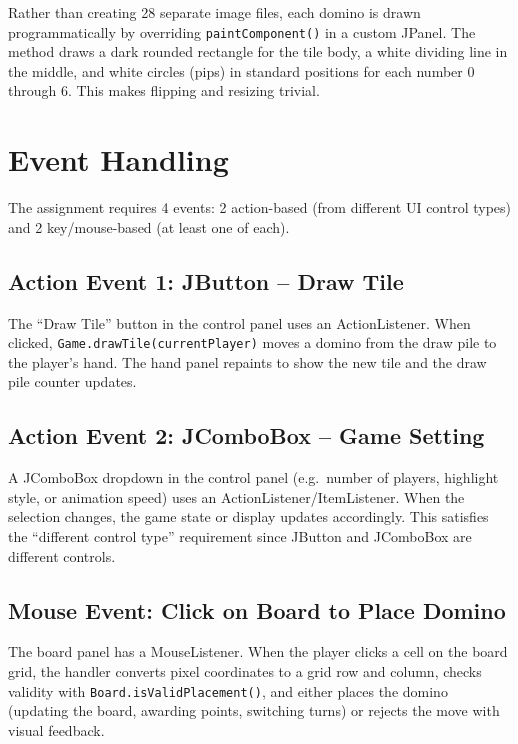 \documentclass[11pt,a4paper]{article}
\begin{document}
Rather than creating 28 separate image files, each domino is drawn programmatically by overriding \texttt{paintComponent()} in a custom JPanel. The method draws a dark rounded rectangle for the tile body, a white dividing line in the middle, and white circles (pips) in standard positions for each number 0 through 6. This makes flipping and resizing trivial.

\section{Event Handling}

The assignment requires 4 events: 2 action-based (from different UI control types) and 2 key/mouse-based (at least one of each).

\subsection{Action Event 1: JButton -- Draw Tile}

The ``Draw Tile'' button in the control panel uses an ActionListener. When clicked, \texttt{Game.drawTile(currentPlayer)} moves a domino from the draw pile to the player's hand. The hand panel repaints to show the new tile and the draw pile counter updates.

\subsection{Action Event 2: JComboBox -- Game Setting}

A JComboBox dropdown in the control panel (e.g.\ number of players, highlight style, or animation speed) uses an ActionListener/ItemListener. When the selection changes, the game state or display updates accordingly. This satisfies the ``different control type'' requirement since JButton and JComboBox are different controls.

\subsection{Mouse Event: Click on Board to Place Domino}

The board panel has a MouseListener. When the player clicks a cell on the board grid, the handler converts pixel coordinates to a grid row and column, checks validity with \texttt{Board.isValidPlacement()}, and either places the domino (updating the board, awarding points, switching turns) or rejects the move with visual feedback.
\end{document}
